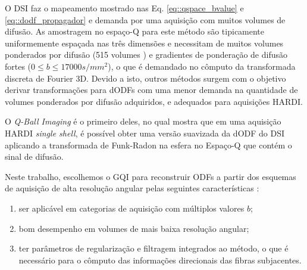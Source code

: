 \documentclass[
    12pt,                %
    oneside,            %
    a4paper,            %
    english,            %
    french,                %
    spanish,            %
    brazil                %
    ]{abntex2}
\begin{document}

O DSI \cite{wedeen2005} faz o mapeamento mostrado nas Eq. \ref{eq::qspace_bvalue} e \ref{eq::dodf_propagador} e demanda por uma aquisição com muitos volumes de difusão. As amostragem no espaço-Q para este método são tipicamente uniformemente espaçada nas três dimensões e necessitam de muitos volumes ponderados por difusão (515 volumes \cite{wedeen2005}) e gradientes de ponderação de difusão fortes ($0 \leq b \leq 17000 s/mm^2$), o que é demandado no cômputo da transformada discreta de Fourier 3D. Devido a isto, outros métodos surgem com o objetivo derivar transformações para dODFs com uma menor demanda na quantidade de volumes ponderados por difusão adquiridos, e adequados para aquisições HARDI.

O \textit{Q-Ball Imaging} é o primeiro deles, no qual  mostra que em uma aquisição HARDI \textit{single shell}, é possível obter uma versão suavizada da dODF do DSI aplicando a transformada de Funk-Radon na esfera no Espaço-Q que contém o sinal de difusão.



Neste trabalho, escolhemos o GQI para reconstruir ODFs a partir dos esquemas de aquisição de alta resolução angular pelas seguintes características \cite{yeh2010}:

\begin{enumerate}
    \item ser aplicável em categorias de aquisição com múltiplos valores $b$;
    \item bom desempenho em volumes de mais baixa resolução angular;
    \item ter parâmetros de regularização e filtragem integrados ao método, o que é necessário para o cômputo das informações direcionais das fibras subjacentes.
\end{enumerate}
\end{document}
